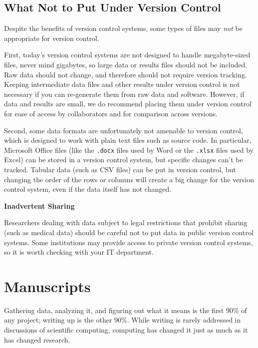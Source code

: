 \documentclass[10pt]{article}
\begin{document}
\subsection*{What Not to Put Under Version Control}

Despite the benefits of version control systems, some types of files
may \emph{not} be appropriate for version control. 

First, today's version control systems are not designed to handle
megabyte-sized files, never mind gigabytes, so large data or 
results files should not be included. Raw data should not change, and 
therefore should not require version tracking. Keeping intermediate
data files and other results under version control is not necessary if you 
can re-generate them from raw data and 
software. However, if data and results are small, we do recommend 
placing them under version control for ease of access by collaborators
and for comparison across versions.

Second, some data formats are unfortunately not amenable to version
control, which is designed to work with plain text files such as
source code.  In particular, Microsoft Office files (like the
\texttt{.docx} files used by Word or the \texttt{.xlsx} files used by
Excel) can be stored in a version control system, but specific changes
can't be tracked. Tabular data (such as CSV
files) can be put in version control, but changing the order of the
rows or columns will create a big change for the version control
system, even if the data itself has not changed.

\begin{framed}
  \noindent \textbf{Inadvertent Sharing}

  Researchers dealing with data subject to legal restrictions that
  prohibit sharing (such as medical data) should be careful not to put
  data in public version control systems. Some institutions may
  provide access to private version control systems, so it is worth
  checking with your IT department.
\end{framed}

\section{Manuscripts}\label{sec:manuscripts}

Gathering data, analyzing it, and figuring out what it means is the
first 90\% of any project; writing up is the other 90\%. While writing
is rarely addressed in discussions of scientific computing, computing
has changed it just as much as it has changed research.
\end{document}
